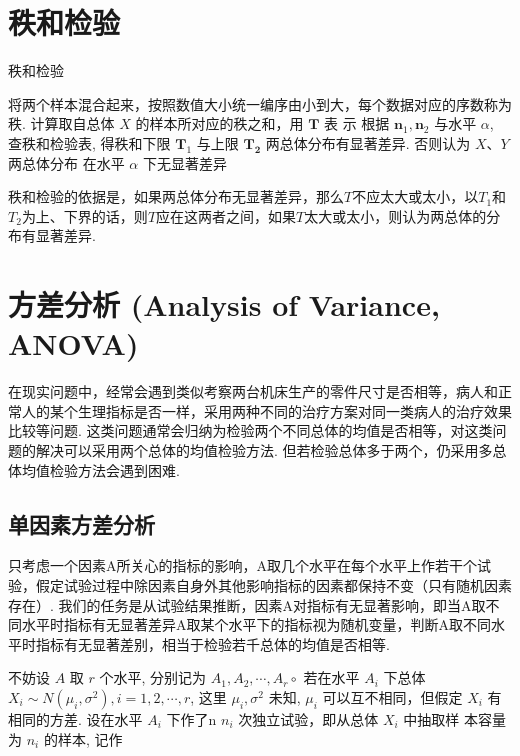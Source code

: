 \section{秩和检验}

\begin{algorithm}\caption{秩和检验}
将两个样本混合起来，按照数值大小统一编序由小到大，每个数据对应的序数称为秩. \;
计算取自总体 \( X \) 的样本所对应的秩之和，用 \( \boldsymbol{T} \) 表 示\;
根据 \( \boldsymbol{n}_{1}, \boldsymbol{n}_{2} \) 与水平 \( \alpha \), 查秩和检验表, 得秩和下限 \( \boldsymbol{T}_{1} \) 与上限 \( \boldsymbol{T}_{\mathbf{2}} \) \;
两总体分布有显著差异. 否则认为 \( X 、 Y \) 两总体分布
在水平 \( \alpha \) 下无显著差异\;
\end{algorithm}

秩和检验的依据是，如果两总体分布无显著差异，那么$T$不应太大或太小，以$T_1$和$T_2$为上、下界的话，则$T$应在这两者之间，如果$T$太大或太小，则认为两总体的分布有显著差异. 

\section{方差分析 (Analysis of Variance, ANOVA)}

在现实问题中，经常会遇到类似考察两台机床生产的零件尺寸是否相等，病人和正常人的某个生理指标是否一样，采用两种不同的治疗方案对同一类病人的治疗效果比较等问题. 这类问题通常会归纳为检验两个不同总体的均值是否相等，对这类问题的解决可以采用两个总体的均值检验方法. 但若检验总体多于两个，仍采用多总体均值检验方法会遇到困难. 

\subsection{单因素方差分析}

只考虑一个因素A所关心的指标的影响，A取几个水平在每个水平上作若干个试验，假定试验过程中除因素自身外其他影响指标的因素都保持不变（只有随机因素存在）. 我们的任务是从试验结果推断，因素A对指标有无显著影响，即当A取不同水平时指标有无显著差异A取某个水平下的指标视为随机变量，判断A取不同水平时指标有无显著差别，相当于检验若千总体的均值是否相等. 

不妨设 $A$ 取 $r$ 个水平, 分别记为 $A_{1}, A_{2}, \cdots, A_{r} \circ$ 若在水平 $A_{i}$ 下总体 $X_{i} \sim N\left(\mu_{i}, \sigma^{2}\right), i=1,2, \cdots, r$, 这里 $\mu_{i}, \sigma^{2}$ 未知, $\mu_{i}$ 可以互不相同，但假定 $X_{i}$ 有相同的方差.  设在水平 $A_{i}$ 下作了n $n_{i}$ 次独立试验，即从总体 $X_{i}$ 中抽取样 本容量为 $n_{i}$ 的样本, 记作

